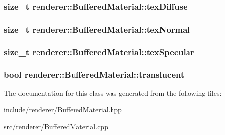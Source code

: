 \hypertarget{classrenderer_1_1BufferedMaterial_a5d032d5a6f15704afa23e1c99ab29daa}{
\subsubsection[{tex\-Diffuse}]{\setlength{\rightskip}{0pt plus 5cm}size\-\_\-t renderer\-::\-Buffered\-Material\-::tex\-Diffuse}}\label{classrenderer_1_1BufferedMaterial_a5d032d5a6f15704afa23e1c99ab29daa}
\hypertarget{classrenderer_1_1BufferedMaterial_a527a615c2eb8020bb5429549202adda0}{
\subsubsection[{tex\-Normal}]{\setlength{\rightskip}{0pt plus 5cm}size\-\_\-t renderer\-::\-Buffered\-Material\-::tex\-Normal}}\label{classrenderer_1_1BufferedMaterial_a527a615c2eb8020bb5429549202adda0}
\hypertarget{classrenderer_1_1BufferedMaterial_a439a1fd4872ab1dffd7c6fcf83e483b2}{
\subsubsection[{tex\-Specular}]{\setlength{\rightskip}{0pt plus 5cm}size\-\_\-t renderer\-::\-Buffered\-Material\-::tex\-Specular}}\label{classrenderer_1_1BufferedMaterial_a439a1fd4872ab1dffd7c6fcf83e483b2}
\hypertarget{classrenderer_1_1BufferedMaterial_aeef52c00da56487af165ddffc1be4f56}{
\subsubsection[{translucent}]{\setlength{\rightskip}{0pt plus 5cm}bool renderer\-::\-Buffered\-Material\-::translucent}}\label{classrenderer_1_1BufferedMaterial_aeef52c00da56487af165ddffc1be4f56}


The documentation for this class was generated from the following files\-:\begin{DoxyCompactItemize}
\item 
include/renderer/\hyperlink{BufferedMaterial_8hpp}{Buffered\-Material.\-hpp}\item 
src/renderer/\hyperlink{BufferedMaterial_8cpp}{Buffered\-Material.\-cpp}\end{DoxyCompactItemize}

